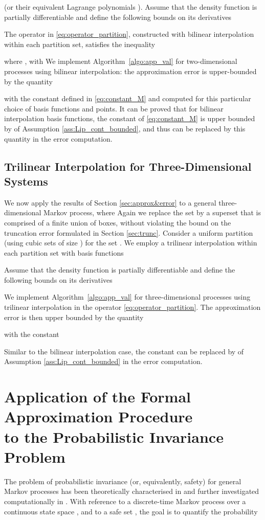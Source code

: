 \documentclass{LMCS}
\begin{document}
(or their equivalent Lagrange polynomials \cite{SAH12}).
Assume that the density function  is partially differentiable and define the following bounds on its derivatives

The operator  in \eqref{eq:operator_partition}, 
constructed with bilinear interpolation within each partition set, 
satisfies the inequality

where , 
with 
We implement Algorithm~\ref{algo:app_val} for two-dimensional processes using bilinear interpolation: 
the approximation error is upper-bounded by the quantity

with the constant  defined in \eqref{eq:constant_M} and computed for this particular choice of basis functions and points.
It can be proved that for bilinear interpolation basis functions,
the constant  of \eqref{eq:constant_M} is upper bounded by  of Assumption \ref{ass:Lip_cont_bounded}, and thus can be replaced by this quantity in the error computation.

\subsection{Trilinear Interpolation for Three-Dimensional Systems}

We now apply the results of Section \ref{sec:approx&error} to a general three-dimensional Markov process, 
where  
Again we replace the set  by a superset that is comprised of a finite union of boxes, 
without violating the bound on the truncation error formulated in Section \ref{sec:trunc}. 
Consider a uniform partition (using cubic sets of size ) for the set .  
We employ a trilinear interpolation within each partition set with basis functions

Assume that the density function  is partially differentiable and define the following bounds on its derivatives

We implement Algorithm~\ref{algo:app_val} for three-dimensional processes using trilinear interpolation in the operator  \eqref{eq:operator_partition}.
The approximation error is then upper bounded by the quantity

with the constant

Similar to the bilinear interpolation case, the constant 
can be replaced by  of Assumption \ref{ass:Lip_cont_bounded} in the error computation.

\section{Application of the Formal Approximation Procedure\\ to the Probabilistic Invariance Problem}
\label{sec:safety}
The problem of probabilistic invariance (or, equivalently, safety) for general Markov processes has been theoretically characterised in \cite{APLS08}  
and further investigated computationally in \cite{APKL10,SA11,SAH12,SA12}. 
With reference to a discrete-time Markov process  over a continuous state space , 
and to a safe set , 
the goal is to quantify the probability
\end{document}
